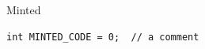 \documentclass[aspectratio=169,10pt]{beamer}
\begin{document}
\begin{frame}[fragile]{Minted}
	\begin{verbatim}
int MINTED_CODE = 0;  // a comment
	\end{verbatim}
\end{frame}
\end{document}
